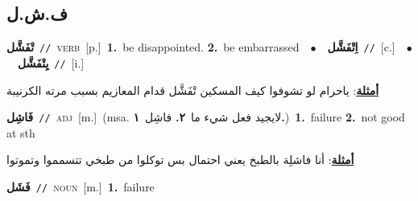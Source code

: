 \documentclass[10pt,a4paper,twoside]{article} %
\begin{document}
\begin{multicols}{2}
\vspace{-3mm}
\subsection*{\color{blue}\foreignlanguage{arabic}{ف.ش.ل}\color{blue}{}} 

{\setlength\topsep{0pt}\textbf{\foreignlanguage{arabic}{تْفَشَّل}}\ {\color{gray}\texttt{//}\color{black}}\ \textsc{verb}\ [p.]\ \textbf{1.}~be disappointed.  \textbf{2.}~be embarrassed\ \ $\bullet$\ \ \setlength\topsep{0pt}\textbf{\foreignlanguage{arabic}{اِتْفَشَّل}}\ {\color{gray}\texttt{//}\color{black}}\ [c.]\ \ $\bullet$\ \ \setlength\topsep{0pt}\textbf{\foreignlanguage{arabic}{يِتْفَشَّل}}\ {\color{gray}\texttt{//}\color{black}}\ [i.]\  \begin{flushright}\color{gray}\foreignlanguage{arabic}{\textbf{\underline{\foreignlanguage{arabic}{أمثلة}}}: ياحرام لو تشوفوا كيف المسكين تْفَشَّل قدام المعازيم بسبب مرته الكرنيبة}\end{flushright}\color{black}} \vspace{2mm}

{\setlength\topsep{0pt}\textbf{\foreignlanguage{arabic}{فَاشِل}}\ {\color{gray}\texttt{//}\color{black}}\ \textsc{adj}\ [m.]\ \color{gray}(msa. \foreignlanguage{arabic}{لايجيد فعل شيء ما}~\foreignlanguage{arabic}{\textbf{٢.}}  \foreignlanguage{arabic}{فاشِل}~\foreignlanguage{arabic}{\textbf{١.}})\color{black}\ \textbf{1.}~failure  \textbf{2.}~not good at sth\  \begin{flushright}\color{gray}\foreignlanguage{arabic}{\textbf{\underline{\foreignlanguage{arabic}{أمثلة}}}: أنا فاشلِة بالطبخ يعني احتمال بس توكلوا من طبخي تتسمموا وتموتوا}\end{flushright}\color{black}} \vspace{2mm}

{\setlength\topsep{0pt}\textbf{\foreignlanguage{arabic}{فَشَل}}\ {\color{gray}\texttt{//}\color{black}}\ \textsc{noun}\ [m.]\ \textbf{1.}~failure\ } \vspace{2mm}


\end{multicols}
\end{document}
